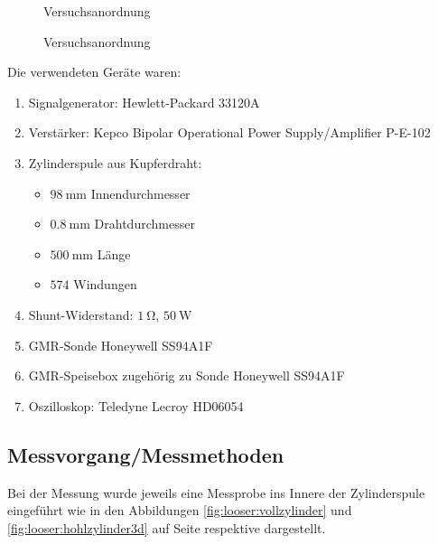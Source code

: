 \begin{figure}[!htb]
    \resizebox{\textwidth}{!}{}
    \caption{Versuchsanordnung}
    \label{fig:versuch:1}
\end{figure}
\begin{figure}[!htb]
    \resizebox{\textwidth}{!}{}
    \caption{Versuchsanordnung}
    \label{fig:versuch:2}
\end{figure}

Die verwendeten Ger\"ate waren:
\begin{enumerate}
    \item
        Signalgenerator: Hewlett-Packard 33120A
    \item
        Verst\"arker: Kepco Bipolar Operational Power Supply/Amplifier P-E-102
    \item
        Zylinderspule aus Kupferdraht:
        \begin{itemize}
            \item
               $\SI{98}{\milli\meter}$ Innendurchmesser
           \item
               $\SI{0.8}{\milli\meter}$ Drahtdurchmesser
           \item
               $\SI{500}{\milli\meter}$ L\"ange
           \item
               $\num{574}$ Windungen
        \end{itemize}
    \item
        Shunt-Widerstand: $\SI{1}{\ohm}$, $\SI{50}{\watt}$
    \item
        GMR-Sonde Honeywell SS94A1F
    \item
        GMR-Speisebox zugeh\"orig zu Sonde Honeywell SS94A1F
    \item
        Oszilloskop: Teledyne Lecroy HD06054
\end{enumerate}


\subsection{Messvorgang/Messmethoden}
\label{sec:durchf:subsec:messmethoden}


Bei  der Messung  wurde jeweils  eine Messprobe  ins Innere  der Zylinderspule
eingef\"uhrt   wie  in   den  Abbildungen   \ref{fig:looser:vollzylinder}  und
\ref{fig:looser:hohlzylinder3d}  auf  Seite  \pageref{fig:looser:vollzylinder}
respektive \pageref{fig:looser:hohlzylinder3d} dargestellt.

